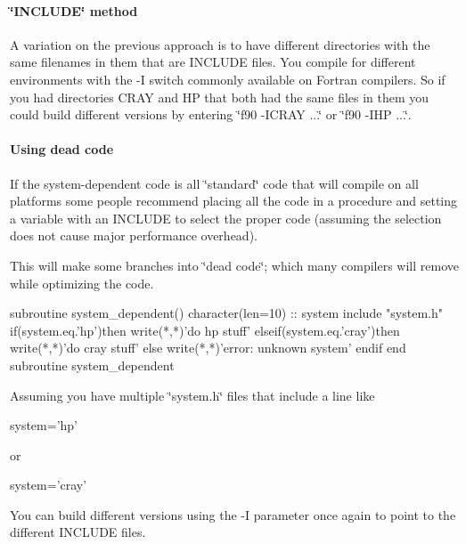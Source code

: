 \paragraph*{\char`\"{}\+I\+N\+C\+L\+U\+D\+E\char`\"{} method }

A variation on the previous approach is to have different directories with the same filenames in them that are I\+N\+C\+L\+U\+DE files. You compile for different environments with the -\/I switch commonly available on Fortran compilers. So if you had directories C\+R\+AY and HP that both had the same files in them you could build different versions by entering \char`\"{}f90 -\/\+I\+C\+R\+A\+Y ...\char`\"{} or \char`\"{}f90 -\/\+I\+H\+P ...\char`\"{}. 

\paragraph*{Using dead code }

If the system-\/dependent code is all \char`\"{}standard\char`\"{} code that will compile on all platforms some people recommend placing all the code in a procedure and setting a variable with an I\+N\+C\+L\+U\+DE to select the proper code (assuming the selection does not cause major performance overhead). 

This will make some branches into \char`\"{}dead code\char`\"{}; which many compilers will remove while optimizing the code. 


\begin{DoxyPre}
      subroutine system\_dependent()
      character(len=10) :: system
      include "system.h"
      if(system.eq.'hp')then
        write(*,*)'do hp stuff'
      elseif(system.eq.'cray')then
        write(*,*)'do cray stuff'
      else
        write(*,*)'error: unknown system'
      endif
      end subroutine system\_dependent
 \end{DoxyPre}


Assuming you have multiple \char`\"{}system.\+h\char`\"{} files that include a line like


\begin{DoxyPre}
      system='hp'
      \end{DoxyPre}
 or 
\begin{DoxyPre}
      system='cray'
      \end{DoxyPre}


You can build different versions using the -\/I parameter once again to point to the different I\+N\+C\+L\+U\+DE files. 

